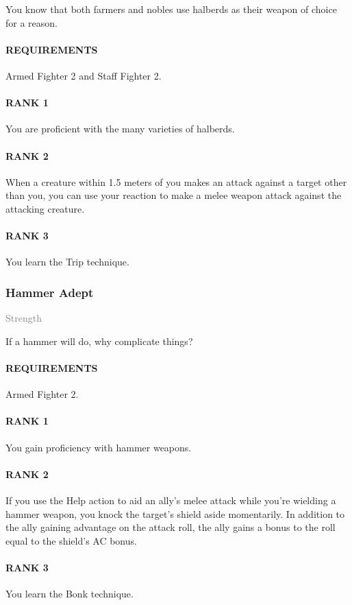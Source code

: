 \normalsize
You know that both farmers and nobles use halberds as their weapon of choice for a reason.
\paragraph{REQUIREMENTS} Armed Fighter 2 and Staff Fighter 2.
\paragraph{RANK 1} You are proficient with the many varieties of halberds.
\paragraph{RANK 2} When a creature within 1.5 meters of you makes an attack against a target other than you, you can use your reaction to make a melee weapon attack against the attacking creature.
\paragraph{RANK 3} You learn the Trip technique.

\subsubsection{Hammer Adept} \label{tal::hammeradept}
\small{\textcolor{gray}{Strength}}

\normalsize
If a hammer will do, why complicate things?
\paragraph{REQUIREMENTS} Armed Fighter 2.
\paragraph{RANK 1} You gain proficiency with hammer weapons.
\paragraph{RANK 2} If you use the Help action to aid an ally's melee attack while you're wielding a hammer weapon, you knock the target's shield aside momentarily.
In addition to the ally gaining advantage on the attack roll, the ally gains a bonus to the roll equal to the shield's AC bonus.
\paragraph{RANK 3} You learn the Bonk technique.

